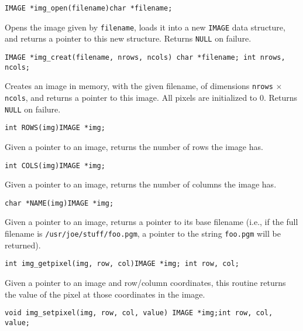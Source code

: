 \begin{description}

\item {\tt IMAGE *img\_open(filename)\newline char *filename;}

Opens the image given by {\tt filename}, loads it into a new {\tt IMAGE}
data structure, and returns a pointer to this new structure.
Returns {\tt NULL} on failure.

\item {\tt IMAGE *img\_creat(filename, nrows, ncols)\newline
char *filename;\newline
int nrows, ncols;}

Creates an image in memory, with the given filename, of dimensions
{\tt nrows} $\times$ {\tt ncols}, and returns a pointer to this image.
All pixels are initialized to 0.  Returns {\tt NULL} on failure.

\item {\tt int ROWS(img)\newline IMAGE *img;}

Given a pointer to an image, returns the number of rows the image has.

\item {\tt int COLS(img)\newline IMAGE *img;}

Given a pointer to an image, returns the number of columns the image has.

\item {\tt char *NAME(img)\newline IMAGE *img;}

Given a pointer to an image, returns a pointer to its base filename
(i.e., if the full
filename is {\tt /usr/joe/stuff/foo.pgm}, a pointer to the string
{\tt foo.pgm} will be returned).

\item {\tt int img\_getpixel(img, row, col)\newline IMAGE *img;\newline
int row, col;}

Given a pointer to an image and row/column coordinates, this routine returns
the value of the pixel at those coordinates in the image.

\item {\tt void img\_setpixel(img, row, col, value)\newline
IMAGE *img;\newline int row, col, value;}


\end{description}
